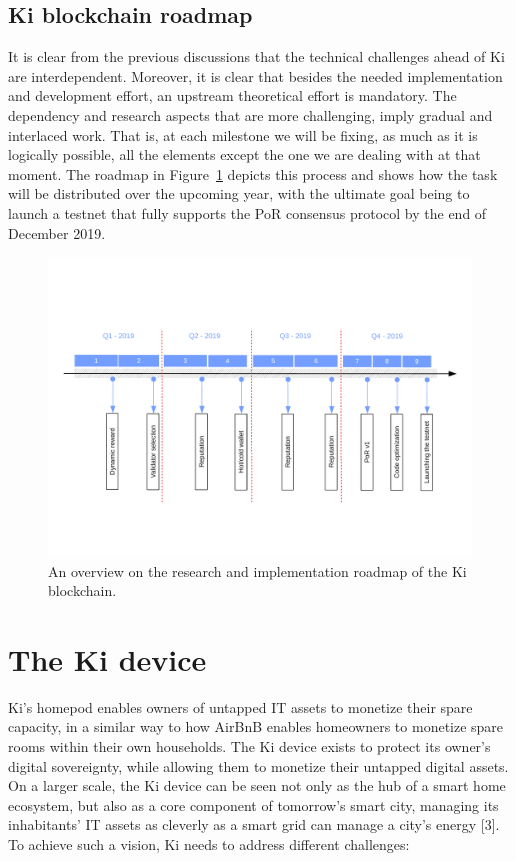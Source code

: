 \subsection{Ki blockchain roadmap}
\label{sec:kiblockchainroad}
It is clear from the previous discussions that the technical challenges ahead of Ki are interdependent. Moreover, it is clear that besides the needed implementation and development effort, an upstream theoretical effort is mandatory. The dependency and research aspects that are more challenging, imply gradual and interlaced work. That is, at each milestone we will be fixing, as much as it is logically possible, all the elements except the one we are dealing with at that moment. The roadmap in Figure~\ref{fig:roadmap} depicts this process and shows how the task will be distributed over the upcoming year, with the ultimate goal being to launch a testnet that fully supports the PoR consensus protocol by the end of December 2019.
\begin{figure}[h]
	\includegraphics[width=\linewidth, trim= 1cm 3cm 1cm 3.5cm, clip]{Figures/Roadmap_f.pdf}
	\caption{An overview on the research and implementation roadmap of the Ki blockchain.}
	\label{fig:roadmap}
\end{figure}
\section{The Ki device}
\label{sec:kidevice}
Ki's homepod enables owners of untapped IT assets to monetize their spare capacity, in a similar way to how AirBnB enables homeowners to monetize spare rooms within their own households. The Ki device exists to protect its owner's digital sovereignty, while allowing them to monetize their untapped digital assets. On a larger scale, the Ki device can be seen not only as the hub of a smart home ecosystem, but also as a core component of tomorrow's smart city, managing its inhabitants' IT assets as cleverly as a smart grid can manage a city's energy [3]. To achieve such a vision, Ki needs to address different challenges:

